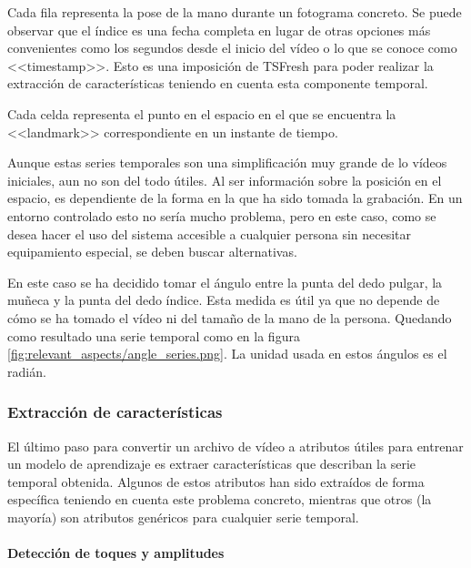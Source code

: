 
Cada fila representa la pose de la mano durante un fotograma concreto. Se puede
observar que el índice es una fecha completa en lugar de otras opciones más
convenientes como los segundos desde el inicio del vídeo o lo que se conoce como
<<timestamp>>. Esto es una imposición de TSFresh para poder realizar la
extracción de características teniendo en cuenta esta componente temporal.

Cada celda representa el punto en el espacio en el que se encuentra la
<<landmark>> correspondiente en un instante de tiempo.

Aunque estas series temporales son una simplificación muy grande de lo vídeos
iniciales, aun no son del todo útiles. Al ser información sobre la posición en
el espacio, es dependiente de la forma en la que ha sido tomada la grabación. En
un entorno controlado esto no sería mucho problema, pero en este caso, como se
desea hacer el uso del sistema accesible a cualquier persona sin necesitar
equipamiento especial, se deben buscar alternativas.

En este caso se ha decidido tomar el ángulo entre la punta del dedo pulgar, la
muñeca y la punta del dedo índice. Esta medida es útil ya que no depende de cómo
se ha tomado el vídeo ni del tamaño de la mano de la persona. Quedando como
resultado una serie temporal como en la figura
\ref{fig:relevant_aspects/angle_series.png}. La unidad usada en estos ángulos es
el radián.


\subsubsection{Extracción de características}

El último paso para convertir un archivo de vídeo a atributos útiles para
entrenar un modelo de aprendizaje es extraer características que describan la
serie temporal obtenida. Algunos de estos atributos han sido extraídos de forma
específica teniendo en cuenta este problema concreto, mientras que otros (la
mayoría) son atributos genéricos para cualquier serie temporal.

\paragraph{Detección de toques y amplitudes}

